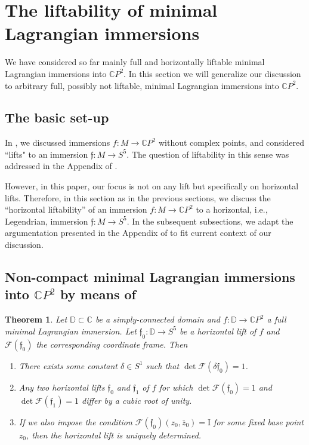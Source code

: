 \documentclass[a4paper,11pt]{amsart}
\newtheorem{theorem}{Theorem}[section]
\theoremstyle{definition}
\numberwithin{equation}{section}
\newcommand{\C}{\mathbb{C}}
\newcommand{\D}{\mathbb{D}}
\newcommand{\f}{\mathfrak{f}}
\begin{document}
\section{The liftability of minimal Lagrangian immersions}
\label{sec:3}

We have considered so far mainly full and horizontally liftable minimal Lagrangian immersions into $\C P^2$. In this section we will generalize our discussion to arbitrary full, possibly not liftable, minimal Lagrangian immersions into $\C P^2$.


\subsection{The basic set-up} \label{subsection: basic set-up}
 \label{subsection: non-compact case}

In \cite{DoKoMa},  we discussed immersions $f: M \to \C P^2$  without complex points, and considered ``lifts" to an immersion $\f: M \to S^5$.
The question of liftability in this sense was addressed in the Appendix  of \cite{DoKoMa}.

However, in this paper, our focus is not on any lift but specifically on horizontal lifts. 
Therefore, in this section  as in the previous sections,  we discuss the ``horizontal liftability'' of an immersion 
$f: M \to \C P^2$ to a horizontal, i.e., Legendrian,  immersion $\f: M \to S^5$.
In the subsequent subsections, we adapt the argumentation presented in the Appendix of \cite{DoKoMa} to fit current context of our discussion. 
 
\subsection{Non-compact minimal Lagrangian immersions into \texorpdfstring{$\C P^2$}{}  by means of \cite{DoKoMa}}
\label{sec:3.2 non-cpt}

 \begin{theorem}\label{Thm: normalized coordinate frame}
 Let $\D \subset \C$ be a simply-connected domain and $f:\D \rightarrow \C P^2$ a full minimal Lagrangian immersion.
 Let $\f_0: \D \rightarrow S^5$ be a horizontal lift of $f$ and $\mathcal{F}(\f_0 )$ 
 the corresponding
 coordinate frame.  
 Then 
 \begin{enumerate}
  \item[a)] There exists some constant $\delta \in  S^1$ such that 
 $\det  \mathcal{F}(\delta\f_0 ) = 1$.
 
 \item[b)] Any two horizontal lifts $\f_0$ and  $\f_1$ of $f$ for which   $\det  \mathcal{F}(\f_0 ) = 1$ and 
  $\det  \mathcal{F}(\f_1 ) = 1$ differ by  a cubic root of unity.
  
  \item[c)] If we also impose the condition
  $\mathcal{F}(\f_0 ) (z_0,\bar{z}_0) = \mathrm{I}$ for some fixed base point $z_0$, 
  then the horizontal lift is uniquely determined.
 \end{enumerate}
 \end{theorem}
 
\end{document}
